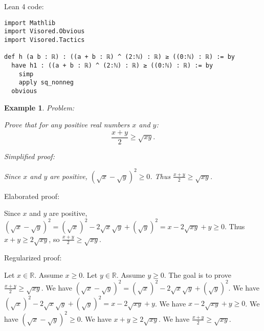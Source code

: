 \documentclass{article}
\newtheorem{example}{Example}
\begin{document}
Lean 4 code:
\begin{tcolorbox}[colback=white!10, width=\linewidth]
\begin{lstlisting}[language=Lean4]
import Mathlib
import Visored.Obvious
import Visored.Tactics

def h (a b : ℝ) : ((a + b : ℝ) ^ (2:ℕ) : ℝ) ≥ ((0:ℕ) : ℝ) := by
  have h1 : ((a + b : ℝ) ^ (2:ℕ) : ℝ) ≥ ((0:ℕ) : ℝ) := by
    simp
    apply sq_nonneg
  obvious

\end{lstlisting}
\end{tcolorbox}


\begin{example}
Problem:
\begin{tcolorbox}[colback=yellow!10, width=\linewidth]
Prove that for any positive real numbers $x$ and $y$:
    $$\frac{x+y}{2} \geq \sqrt{xy}.$$
\end{tcolorbox}

Simplified proof:
\begin{tcolorbox}[colback=blue!10, width=\linewidth]
Since $x$ and $y$ are positive, $(\sqrt x - \sqrt y)^2 \ge 0$. Thus $\frac{x+y}{2} \ge \sqrt{xy}$.
\end{tcolorbox}
\end{example}

Elaborated proof:
\begin{tcolorbox}[colback=green!10, width=\linewidth]
Since $x$ and $y$ are positive, $(\sqrt x - \sqrt y)^2 = (\sqrt x)^2 - 2\sqrt x \sqrt y + (\sqrt y)^2 = x - 2\sqrt{xy} + y \ge 0$. Thus $x + y \ge 2\sqrt{xy}$, so $\frac{x+y}{2} \ge \sqrt{xy}$.
\end{tcolorbox}

Regularized proof:
\begin{tcolorbox}[colback=red!10, width=\linewidth]
Let $x\in\mathbb{R}$. Assume $x\ge 0$.
Let $y\in\mathbb{R}$. Assume $y\ge 0$.
The goal is to prove $\frac{x+y}{2} \ge \sqrt{xy}$.
We have ${{(\sqrt x - \sqrt y)}}^2 = {{(\sqrt x)}}^2 - 2\sqrt x \sqrt y + {{(\sqrt y)}}^2$.
We have ${{(\sqrt x)}}^2 - 2\sqrt x \sqrt y + {{(\sqrt y)}}^2 = x - 2\sqrt{xy} + y$.
We have $x - 2\sqrt{xy} + y \ge 0$.
We have ${{(\sqrt x - \sqrt y)}}^2 \ge 0$.
We have $x + y \ge 2\sqrt{xy}$.
We have $\frac{x+y}{2} \ge \sqrt{xy}$.
\end{tcolorbox}
\end{document}
